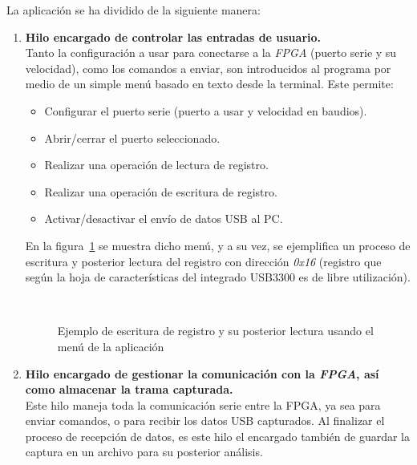 La aplicación se ha dividido de la siguiente manera:
\begin{enumerate}
    \item \textbf{Hilo encargado de controlar las entradas de usuario.} \\
    Tanto la configuración a usar para conectarse a la \emph{FPGA} (puerto serie y su velocidad), como los comandos a enviar, son introducidos al programa por medio de un simple menú basado en texto desde la terminal. Este permite:
    \begin{itemize}
        \item Configurar el puerto serie (puerto a usar y velocidad en baudios).
        \item Abrir/cerrar el puerto seleccionado.
        \item Realizar una operación de lectura de registro.
        \item Realizar una operación de escritura de registro.
        \item Activar/desactivar el envío de datos USB al PC.
    \end{itemize}

    En la figura~\ref{fig:matriz-app-menu} se muestra dicho menú, y a su vez, se ejemplifica un proceso de escritura y posterior lectura del registro con dirección \emph{0x16} (registro que según la hoja de características del integrado USB3300\cite{microchip:usb3300} es de libre utilización).

    \begin{figure}[htbp]
        \centering
         \\
        \caption{Ejemplo de escritura de registro y su posterior lectura usando el menú de la aplicación} 
        \label{fig:matriz-app-menu}
    \end{figure}
    
    \item \textbf{Hilo encargado de gestionar la comunicación con la \emph{FPGA}, así como almacenar la trama capturada.} \\
    Este hilo maneja toda la comunicación serie entre la FPGA, ya sea para enviar comandos, o para recibir los datos USB capturados. Al finalizar el proceso de recepción de datos, es este hilo el encargado también de guardar la captura en un archivo para su posterior análisis.
\end{enumerate}


